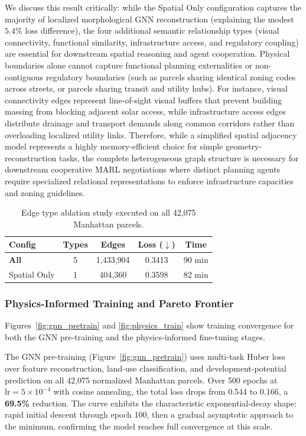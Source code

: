 \documentclass[final,3p,times]{elsarticle}
\begin{document}
We discuss this result critically: while the Spatial Only configuration captures the majority of localized morphological GNN reconstruction (explaining the modest $5.4\%$ loss difference), the four additional semantic relationship types (visual connectivity, functional similarity, infrastructure access, and regulatory coupling) are essential for downstream spatial reasoning and agent cooperation. Physical boundaries alone cannot capture functional planning externalities or non-contiguous regulatory boundaries (such as parcels sharing identical zoning codes across streets, or parcels sharing transit and utility hubs). For instance, visual connectivity edges represent line-of-sight visual buffers that prevent building massing from blocking adjacent solar access, while infrastructure access edges distribute drainage and transport demands along common corridors rather than overloading localized utility links. Therefore, while a simplified spatial adjacency model represents a highly memory-efficient choice for simple geometry-reconstruction tasks, the complete heterogeneous graph structure is necessary for downstream cooperative MARL negotiations where distinct planning agents require specialized relational representations to enforce infrastructure capacities and zoning guidelines.

\begin{table}[h]
\centering
\caption{Edge type ablation study executed on all 42,075 Manhattan parcels.}
\label{tab:ablation}
\begin{tabular}{lcccc}
\toprule
\textbf{Config} & \textbf{Types} & \textbf{Edges} & \textbf{Loss} ($\downarrow$) & \textbf{Time} \\
\midrule
\textbf{All} & 5 & 1,433,904 & 0.3413 & 90 min \\
Spatial Only & 1 & 404,360 & 0.3598 & 82 min \\
\bottomrule
\end{tabular}
\end{table}


\subsubsection{Physics-Informed Training and Pareto Frontier}

Figures~\ref{fig:gnn_pretrain} and \ref{fig:physics_train} show training convergence for both the GNN pre-training and the physics-informed fine-tuning stages.

The GNN pre-training (Figure~\ref{fig:gnn_pretrain}) uses multi-task Huber loss over feature reconstruction, land-use classification, and development-potential prediction on all 42,075 normalized Manhattan parcels. Over 500 epochs at $\text{lr} = 5 \times 10^{-4}$ with cosine annealing, the total loss drops from 0.544 to 0.166, a \textbf{69.5\%} reduction. The curve exhibits the characteristic exponential-decay shape: rapid initial descent through epoch 100, then a gradual asymptotic approach to the minimum, confirming the model reaches full convergence at this scale.
\end{document}
